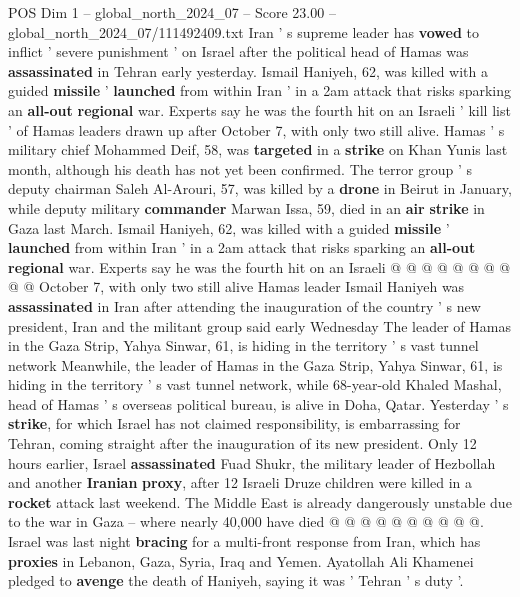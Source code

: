 \begin{textsample}{POS Dim 1 – global\_north\_2024\_07 – Score 23.00 – global\_north\_2024\_07/111492409.txt}  \label{ex:f1_pos_189}
Iran ' s supreme leader has \textbf{vowed} to inflict ' severe punishment ' on Israel after the political head of Hamas was \textbf{assassinated} in Tehran early yesterday.
Ismail Haniyeh, 62, was killed with a guided \textbf{missile} ' \textbf{launched} from within Iran ' in a 2am attack that risks sparking an \textbf{all-out} \textbf{regional} war.
Experts say he was the fourth hit on an Israeli ' kill list ' of Hamas leaders drawn up after October 7, with only two still alive.
Hamas ' s military chief Mohammed Deif, 58, was \textbf{targeted} in a \textbf{strike} on Khan Yunis last month, although his death has not yet been confirmed.
The terror group ' s deputy chairman Saleh Al-Arouri, 57, was killed by a \textbf{drone} in Beirut in January, while deputy military \textbf{commander} Marwan Issa, 59, died in an \textbf{air} \textbf{strike} in Gaza last March.
Ismail Haniyeh, 62, was killed with a guided \textbf{missile} ' \textbf{launched} from within Iran ' in a 2am attack that risks sparking an \textbf{all-out} \textbf{regional} war.
Experts say he was the fourth hit on an Israeli @ @ @ @ @ @ @ @ @ @ October 7, with only two still alive Hamas leader Ismail Haniyeh was \textbf{assassinated} in Iran after attending the inauguration of the country ' s new president, Iran and the militant group said early Wednesday The leader of Hamas in the Gaza Strip, Yahya Sinwar, 61, is hiding in the territory ' s vast tunnel network Meanwhile, the leader of Hamas in the Gaza Strip, Yahya Sinwar, 61, is hiding in the territory ' s vast tunnel network, while 68-year-old Khaled Mashal, head of Hamas ' s overseas political bureau, is alive in Doha, Qatar.
Yesterday ' s \textbf{strike}, for which Israel has not claimed responsibility, is embarrassing for Tehran, coming straight after the inauguration of its new president.
Only 12 hours earlier, Israel \textbf{assassinated} Fuad Shukr, the military leader of Hezbollah and another \textbf{Iranian} \textbf{proxy}, after 12 Israeli Druze children were killed in a \textbf{rocket} attack last weekend.
The Middle East is already dangerously unstable due to the war in Gaza -- where nearly 40,000 have died @ @ @ @ @ @ @ @ @ @.
Israel was last night \textbf{bracing} for a multi-front response from Iran, which has \textbf{proxies} in Lebanon, Gaza, Syria, Iraq and Yemen.
Ayatollah Ali Khamenei pledged to \textbf{avenge} the death of Haniyeh, saying it was ' Tehran ' s duty '.

\end{textsample}
